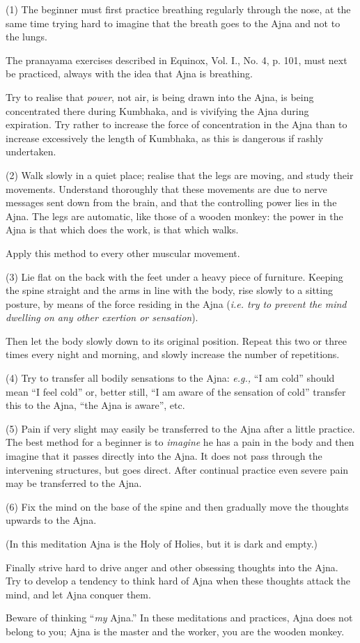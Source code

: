 (1) The beginner must first practice breathing regularly through the nose, at the same time trying hard to imagine that the breath goes to the Ajna and not to the lungs.

The pranayama exercises described in Equinox, Vol. I., No. 4, p. 101, must next be practiced, always with the idea that Ajna is breathing.

Try to realise that \textit{power}, not air, is being drawn into the Ajna, is being concentrated there during Kumbhaka, and is vivifying the Ajna during expiration. Try rather to increase the force of concentration in the Ajna than to increase excessively the length of Kumbhaka, as this is dangerous if rashly undertaken.

(2) Walk slowly in a quiet place; realise that the legs are moving, and study their movements. Understand thoroughly that these movements are due to nerve messages sent down from the brain, and that the controlling power lies in the Ajna. The legs are automatic, like those of a wooden monkey: the power in the Ajna is that which does the work, is that which walks.

Apply this method to every other muscular movement.

(3) Lie flat on the back with the feet under a heavy piece of furniture. Keeping the spine straight and the arms in line with the body, rise slowly to a sitting posture, by means of the force residing in the Ajna (\textit{i.e. try to prevent the mind dwelling on any other exertion or sensation}).

Then let the body slowly down to its original position. Repeat this two or three times every night and morning, and slowly increase the number of repetitions.

(4) Try to transfer all bodily sensations to the Ajna: \textit{e.g.,} \enquote{I am cold} should mean \enquote{I feel cold} or, better still, \enquote{I am aware of the sensation of cold} \textemdash{} transfer this to the Ajna, \enquote{the Ajna is aware}, etc.

(5) Pain if very slight may easily be transferred to the Ajna after a little practice. The best method for a beginner is to \textit{imagine} he has a pain in the body and then imagine that it passes directly into the Ajna. It does not pass through the intervening structures, but goes direct. After continual practice even severe pain may be transferred to the Ajna.

(6) Fix the mind on the base of the spine and then gradually move the thoughts upwards to the Ajna.

(In this meditation Ajna is the Holy of Holies, but it is dark and empty.)

Finally strive hard to drive anger and other obsessing thoughts into the Ajna. Try to develop a tendency to think hard of Ajna when these thoughts attack the mind, and let Ajna conquer them.

Beware of thinking \enquote{\textit{my} Ajna.} In these meditations and practices, Ajna does not belong to you; Ajna is the master and the worker, you are the wooden monkey.

